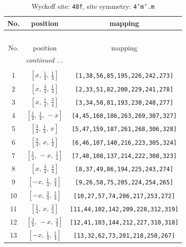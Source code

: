 \documentclass[fleqn,8pt]{jsarticle}
\begin{document}
\begin{longtable}{ccc}
\caption{Wyckoff site: {\tt 48f}, site symmetry: {\tt 4'm'.m}}
 \\
 \hline \hline
No. & position & mapping \\ \hline \endfirsthead

\multicolumn{2}{l}{\tablename\ \thetable{}} \\
 \hline \hline
No. & position & mapping \\ \hline \endhead

 \hline \hline
\multicolumn{2}{r}{\footnotesize\it continued ...} \\ \endfoot

 \hline \hline
\multicolumn{2}{r}{} \\ \endlastfoot

1 & $\left[ x,\, \frac{1}{4},\, \frac{1}{4} \right]$ & {\tt [1,38,56,85,195,226,242,273]} \\ \hline
2 & $\left[ x,\, \frac{3}{4},\, \frac{1}{4} \right]$ & {\tt [2,33,51,82,200,229,241,278]} \\ \hline
3 & $\left[ x,\, \frac{1}{4},\, \frac{3}{4} \right]$ & {\tt [3,34,50,81,193,230,248,277]} \\ \hline
4 & $\left[ \frac{1}{4},\, \frac{1}{4},\, - x \right]$ & {\tt [4,45,160,186,263,269,307,327]} \\ \hline
5 & $\left[ \frac{3}{4},\, \frac{1}{4},\, x \right]$ & {\tt [5,47,159,187,261,268,306,328]} \\ \hline
6 & $\left[ \frac{3}{4},\, x,\, \frac{1}{4} \right]$ & {\tt [6,46,107,140,216,223,305,324]} \\ \hline
7 & $\left[ \frac{1}{4},\, - x,\, \frac{1}{4} \right]$ & {\tt [7,48,108,137,214,222,308,323]} \\ \hline
8 & $\left[ x,\, \frac{3}{4},\, \frac{3}{4} \right]$ & {\tt [8,37,49,86,194,225,243,274]} \\ \hline
9 & $\left[ - x,\, \frac{1}{4},\, \frac{3}{4} \right]$ & {\tt [9,26,58,75,205,224,254,265]} \\ \hline
10 & $\left[ - x,\, \frac{3}{4},\, \frac{1}{4} \right]$ & {\tt [10,27,57,74,206,217,253,272]} \\ \hline
11 & $\left[ \frac{1}{4},\, x,\, \frac{3}{4} \right]$ & {\tt [11,44,102,142,209,228,312,319]} \\ \hline
12 & $\left[ \frac{3}{4},\, - x,\, \frac{3}{4} \right]$ & {\tt [12,41,103,144,212,227,310,318]} \\ \hline
13 & $\left[ - x,\, \frac{1}{4},\, \frac{1}{4} \right]$ & {\tt [13,32,62,73,201,218,250,267]} \\ \hline

\end{longtable}
\end{document}
